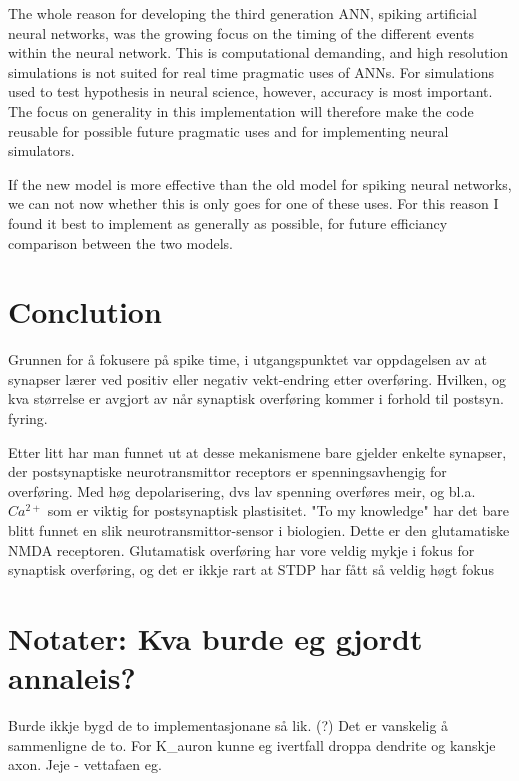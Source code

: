 The whole reason for developing the third generation ANN, spiking artificial neural networks, was the growing focus on the timing of the different events within the neural network.
This is computational demanding, and high resolution simulations is not suited for real time pragmatic uses of ANNs. For simulations used to test hypothesis in neural science, however, accuracy is most important.
The focus on generality in this implementation will therefore make the code reusable for possible future pragmatic uses and for implementing neural simulators.

If the new model is more effective than the old model for spiking neural networks, we can not now whether this is only goes for one of these uses. 
For this reason I found it best to implement as generally as possible, for future efficiancy comparison between the two models.



\section{Conclution}
Grunnen for å fokusere på spike time, i utgangspunktet var oppdagelsen av at synapser lærer ved positiv eller negativ vekt-endring etter overføring. 
Hvilken, og kva størrelse er avgjort av når synaptisk overføring kommer i forhold til postsyn. fyring.

Etter litt har man funnet ut at desse mekanismene bare gjelder enkelte synapser, der postsynaptiske neurotransmittor receptors er spenningsavhengig for overføring. 
Med høg depolarisering, dvs lav spenning overføres meir, og bl.a. $Ca^{2+}$ som er viktig for postsynaptisk plastisitet.
"To my knowledge" har det bare blitt funnet en slik neurotransmittor-sensor i biologien. Dette er den glutamatiske NMDA receptoren.
Glutamatisk overføring har vore veldig mykje i fokus for synaptisk overføring, og det er ikkje rart at STDP har fått så veldig høgt fokus %


\section{Notater: Kva burde eg gjordt annaleis?}
Burde ikkje bygd de to implementasjonane så lik. (?)
Det er vanskelig å sammenligne de to. For K\_auron kunne eg ivertfall droppa dendrite og kanskje axon.
Jeje - vettafaen eg.

